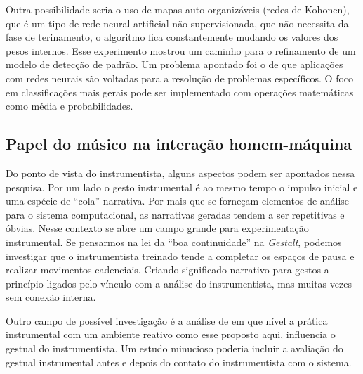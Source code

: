 \documentclass{ppgmus}
\begin{document}
Outra possibilidade seria o uso de mapas auto-organizáveis (redes de Kohonen), que é
um tipo de rede neural artificial não supervisionada, que não necessita
da fase de terinamento, o algoritmo fica constantemente mudando os valores dos pesos internos.
Esse experimento mostrou um caminho para o refinamento de um modelo de detecção de padrão.
Um problema apontado foi o de que aplicações com redes neurais são voltadas
para a resolução de problemas específicos. O foco em classificações mais gerais
pode ser implementado com operações matemáticas como média e probabilidades.



% 
% 
% 
% 
 



\subsection{Papel do músico na interação homem-máquina}


Do ponto de vista do instrumentista, alguns aspectos podem ser apontados nessa pesquisa.
Por um lado o gesto instrumental é ao mesmo tempo o impulso inicial e uma espécie
de ``cola'' narrativa. Por mais que se forneçam elementos de análise para o sistema
computacional, as narrativas geradas tendem a ser repetitivas e óbvias. Nesse contexto
se abre um campo grande para experimentação instrumental. Se pensarmos na lei da ``boa continuidade''
na \textit{Gestalt}, podemos investigar que o instrumentista treinado tende a completar
os espaços de pausa e realizar movimentos cadenciais. Criando significado narrativo
para gestos a princípio ligados pelo vínculo com a análise do instrumentista, mas muitas
vezes sem conexão interna.

Outro campo de possível investigação é a análise de em que
nível a prática instrumental com um ambiente reativo como
esse proposto aqui, influencia o gestual do instrumentista.
Um estudo minucioso poderia incluir a avaliação do gestual
instrumental antes e depois do contato do instrumentista com 
o sistema.
\end{document}

